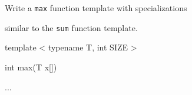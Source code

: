 Write a \texttt{max} function template with specializations

similar to the \texttt{sum} function template.



\begin{consolethree}[escapeinside=||]

template < typename T, int SIZE >

int max(T x[])

{

    ...

}

\end{consolethree}

